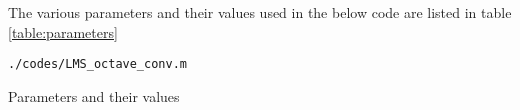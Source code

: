 The various parameters and their values used in the below code are listed in table \ref{table:parameters} 
\begin{lstlisting}
./codes/LMS_octave_conv.m
\end{lstlisting}
\begin{table}[ht!]
\centering

\caption{Parameters and their values}
\label{table:parameters}
\end{table}
